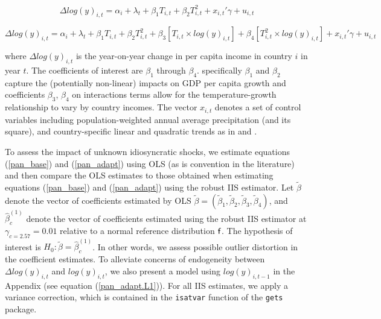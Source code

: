 \documentclass[11pt, letterpaper]{article}
\numberwithin{algorithm}{section}
\numberwithin{assumption}{section}
\numberwithin{lemma}{section}
\numberwithin{theorem}{section}
\numberwithin{corollary}{section}
\numberwithin{remark}{section}
\numberwithin{equation}{section}
\numberwithin{figure}{section}
\numberwithin{table}{section}
\newcommand{\ignore}[1]{}
\begin{document}
\begin{small}
\begin{equation}
\label{pan_base}
\Delta log(y)_{i,t} = \alpha_i + \lambda_t + \beta_1 T_{i,t} + \beta_2 T^2_{i,t} + x_{i,t}'\gamma + u_{i,t}
\end{equation}
\end{small}


\begin{small}
\begin{equation}
\label{pan_adapt}
\Delta log(y)_{i,t} = \alpha_i + \lambda_t + \beta_1 T_{i,t} + \beta_2 T^2_{i,t} + \beta_3 \left[ T_{i,t} \times  log(y)_{i, t} \right] + \beta_4 \left[  T^2_{i,t} \times  log(y)_{i, t} \right] + x_{i,t}'\gamma + u_{i,t}
\end{equation}
\end{small}

where $\Delta log(y)_{i,t}$ is the year-on-year change in per capita income in country $i$ in year $t$. The coefficients of interest are $\beta_1$ through $\beta_4$. specifically $\beta_1$ and $\beta_2$ capture the (potentially non-linear) impacts on GDP per capita growth and coefficients $\beta_3$, $\beta_4$ on interactions terms allow for the temperature-growth relationship to vary by country incomes. The vector $x_{i,t}$ denotes a set of control variables including population-weighted annual average precipitation (and its square), and country-specific linear and quadratic trends as in \citet{burke2015global} and \citet{pretis2018uncertain}.

To assess the impact of unknown idiosyncratic shocks, we estimate equations (\ref{pan_base}) and (\ref{pan_adapt}) using OLS (as is convention in the literature) and then compare the OLS estimates to those obtained when estimating equations (\ref{pan_base}) and (\ref{pan_adapt}) using the robust IIS estimator. Let $\tilde{\beta}$ denote the vector of coefficients estimated by OLS $\tilde{\beta}=(\tilde{\beta}_1, \tilde{\beta}_2, \tilde{\beta}_3, \tilde{\beta}_4)$, and $\hat{\beta}^{( 1)}_{c}$ denote the vector of coefficients estimated using the robust IIS estimator at $\gamma_{c=2.57}=0.01$ relative to a normal reference distribution ${\sf f}$. The hypothesis of interest is $H_0: \tilde{\beta} = \hat{\beta}^{( 1)}_{c}$. In other words, we assess possible outlier distortion in the coefficient estimates. To alleviate concerns of endogeneity between $\Delta log(y)_{i,t}$ and $log(y)_{i, t}$, we also present a model using $log(y)_{i, t-1}$ in the Appendix (see equation (\ref{pan_adapt.L1})).
For all IIS estimates, we apply a variance correction, which is contained in the \texttt{isatvar} function of the \texttt{gets} package.\ignore{@Felix can you provide more information here please?}
\end{document}

